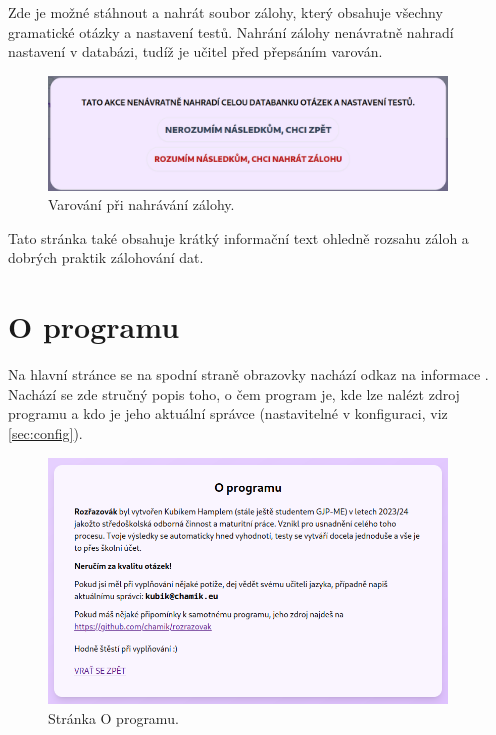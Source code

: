 Zde je možné stáhnout a nahrát soubor zálohy, který obsahuje všechny gramatické otázky a nastavení testů. Nahrání zálohy nenávratně nahradí nastavení v databázi, tudíž je učitel před přepsáním varován.

\begin{figure}[H]
    \centering
    \includegraphics[width=400px]{images/01design/backup-warning.png}
    \caption{Varování při nahrávání zálohy.}
\end{figure}

Tato stránka také obsahuje krátký informační text ohledně rozsahu záloh a dobrých praktik zálohování dat.

\pagebreak
\section{O programu}

Na hlavní stránce se na spodní straně obrazovky nachází odkaz na informace . Nachází se zde stručný popis toho, o čem program je, kde lze nalézt zdroj programu a kdo je jeho aktuální správce (nastavitelné v konfiguraci, viz \ref{sec:config}).

\begin{figure}[H]
    \centering
    \includegraphics[width=400px]{images/01design/about.png}
    \caption{Stránka O programu.}
\end{figure}

